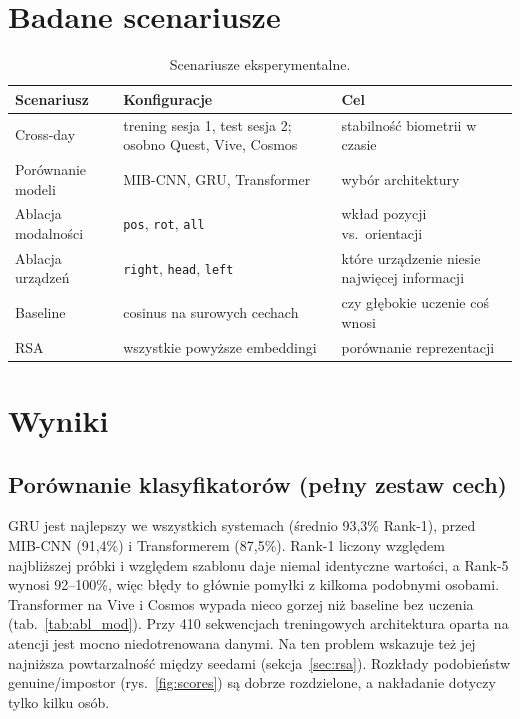 \documentclass[11pt,a4paper]{article}
\begin{document}
\section{Badane scenariusze}
\begin{table}[H]\centering\small
\caption{Scenariusze eksperymentalne.}
\begin{tabular}{p{3.2cm}p{6.8cm}p{5.6cm}}\toprule
Scenariusz & Konfiguracje & Cel \\\midrule
Cross-day & trening sesja 1, test sesja 2; osobno Quest, Vive, Cosmos & stabilność biometrii w czasie \\
Porównanie modeli & MIB-CNN, GRU, Transformer & wybór architektury \\
Ablacja modalności & \texttt{pos}, \texttt{rot}, \texttt{all} & wkład pozycji vs.\ orientacji \\
Ablacja urządzeń & \texttt{right}, \texttt{head}, \texttt{left} & które urządzenie niesie najwięcej informacji \\
Baseline & cosinus na surowych cechach & czy głębokie uczenie coś wnosi \\
RSA & wszystkie powyższe embeddingi & porównanie reprezentacji \\\bottomrule
\end{tabular}
\end{table}

\section{Wyniki}
\subsection{Porównanie klasyfikatorów (pełny zestaw cech)}


GRU jest najlepszy we wszystkich systemach (średnio 93,3\% Rank-1), przed MIB-CNN (91,4\%) i Transformerem (87,5\%).
Rank-1 liczony względem najbliższej próbki i względem szablonu daje niemal identyczne wartości, a Rank-5 wynosi 92--100\%,
więc błędy to głównie pomyłki z kilkoma podobnymi osobami. Transformer na Vive i Cosmos wypada nieco gorzej niż baseline
bez uczenia (tab.~\ref{tab:abl_mod}). Przy 410 sekwencjach treningowych architektura oparta na atencji jest mocno
niedotrenowana danymi. Na ten problem wskazuje też jej najniższa powtarzalność między seedami (sekcja~\ref{sec:rsa}).
Rozkłady podobieństw genuine/impostor (rys.~\ref{fig:scores}) są dobrze rozdzielone, a nakładanie dotyczy tylko kilku osób.
\end{document}
